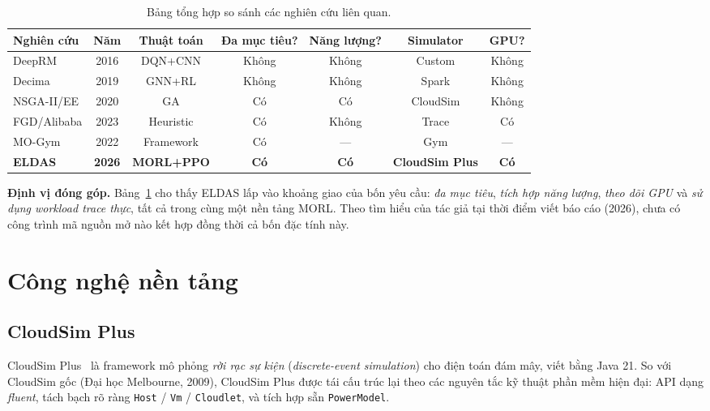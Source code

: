 \begin{table}[H]
  \centering
  \caption{Bảng tổng hợp so sánh các nghiên cứu liên quan.}
  \label{tab:related-work}
  \footnotesize
  \begin{tabular}{lcccccc}
    \toprule
    \textbf{Nghiên cứu} & \textbf{Năm} & \textbf{Thuật toán}
                       & \textbf{Đa mục tiêu?} & \textbf{Năng lượng?}
                       & \textbf{Simulator} & \textbf{GPU?} \\
    \midrule
    DeepRM      & 2016 & DQN+CNN  & Không & Không & Custom    & Không \\
    Decima      & 2019 & GNN+RL   & Không & Không & Spark     & Không \\
    NSGA-II/EE  & 2020 & GA       & Có    & Có    & CloudSim  & Không \\
    FGD/Alibaba & 2023 & Heuristic& Có    & Không & Trace     & Có    \\
    MO-Gym      & 2022 & Framework& Có    & ---   & Gym       & ---   \\
    \textbf{ELDAS} & \textbf{2026} & \textbf{MORL+PPO}
                & \textbf{Có} & \textbf{Có} & \textbf{CloudSim Plus}
                & \textbf{Có} \\
    \bottomrule
  \end{tabular}
\end{table}

\textbf{Định vị đóng góp.} Bảng~\ref{tab:related-work} cho thấy ELDAS
lấp vào khoảng giao của bốn yêu cầu: \textit{đa mục tiêu}, \textit{tích
hợp năng lượng}, \textit{theo dõi GPU} và \textit{sử dụng workload
trace thực}, tất cả trong cùng một nền tảng MORL. Theo tìm hiểu của
tác giả tại thời điểm viết báo cáo (2026), chưa có công trình mã nguồn
mở nào kết hợp đồng thời cả bốn đặc tính này.

\section{Công nghệ nền tảng}
\label{sec:cong-nghe-nen-tang}

\subsection{CloudSim Plus}
CloudSim Plus~\cite{filho2017cloudsim} là framework mô phỏng \textit{rời
rạc sự kiện} (\textit{discrete-event simulation}) cho điện toán đám
mây, viết bằng Java 21. So với CloudSim gốc (Đại học Melbourne, 2009),
CloudSim Plus được tái cấu trúc lại theo các nguyên tắc kỹ thuật phần
mềm hiện đại: API dạng \textit{fluent}, tách bạch rõ ràng
\texttt{Host} / \texttt{Vm} / \texttt{Cloudlet}, và tích hợp sẵn
\texttt{PowerModel}.

